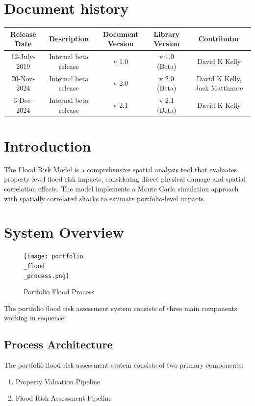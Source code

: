 \documentclass{article}
\begin{document}
\section{Document history}
\begin{table}[ht]
	\centering
	\begin{tabular}{c|c|c|c|c}
		Release Date & Description & Document Version & Library Version & Contributor\\
		\hline
		12-July-2019 & Internal beta release & v 1.0 & v 1.0 (Beta) & David K Kelly\\
		20-Nov-2024 & Internal beta release & v 2.0 & v 2.0 (Beta) & David K Kelly,  Jack Mattimore\\
		3-Dec-2024 & Internal beta release & v 2.1 & v 2.1 (Beta) & David K Kelly
	\end{tabular}
	\label{tab:revision_history}
\end{table}

\clearpage

\section{Introduction}


The Flood Risk Model is a comprehensive spatial analysis tool that evaluates property-level flood risk impacts, considering direct physical damage and spatial correlation effects. The model implements a Monte Carlo simulation approach with spatially correlated shocks to estimate portfolio-level impacts.

\newpage
\section{System Overview}

\begin{figure}[h]
\centering
\texttt{[image: portfolio\\\_flood\\\_process.png]}
\caption{Portfolio Flood Process}
\label{fig:portfolio_flood_process}
\end{figure}
\vspace*{2cm}

The portfolio flood risk assessment system consists of three main components working in sequence:
\subsection{Process Architecture}
The portfolio flood risk assessment system consists of two primary components:
\begin{enumerate}
    \item Property Valuation Pipeline
    \item Flood Risk Assessment Pipeline
\end{enumerate}
\end{document}
